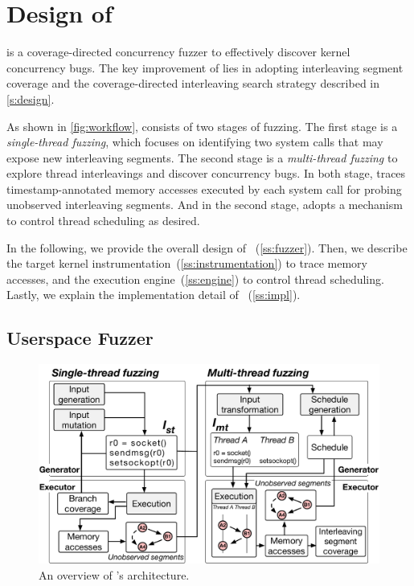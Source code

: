 \section{Design of \sys}
\label{s:impl}

\sys is a coverage-directed concurrency fuzzer to effectively discover
kernel concurrency bugs.
%
The key improvement of \sys lies in adopting interleaving segment
coverage and the coverage-directed interleaving search strategy
described in \autoref{s:design}.
%

As shown in \autoref{fig:workflow}, \sys consists of two stages of
fuzzing.
%
The first stage is a \textit{single-thread fuzzing}, which focuses on
identifying two system calls that may expose new interleaving
segments.
%
The second stage is a \textit{multi-thread fuzzing} to explore thread
interleavings and discover concurrency bugs.
%
In both stage, \sys traces timestamp-annotated memory accesses
executed by each system call for probing unobserved interleaving
segments.
%
And in the second stage, \sys adopts a mechanism to control thread
scheduling as desired.



In the following, we provide the overall design of
\sys~(\autoref{ss:fuzzer}).
%
Then, we describe the target kernel
instrumentation~(\autoref{ss:instrumentation}) to trace memory
accesses, and the execution engine~(\autoref{ss:engine}) to control
thread scheduling.
%
Lastly, we explain the implementation detail of
\sys~(\autoref{ss:impl}).




\subsection{Userspace Fuzzer}
\label{ss:fuzzer}



\begin{figure}
  \centering
  \includegraphics[width=\linewidth]{fig/architecture.pdf}
  \caption{An overview of \sys's architecture.}
  \label{fig:workflow}
\end{figure}


